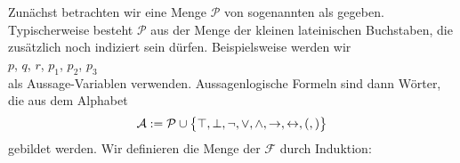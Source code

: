 Zunächst betrachten wir eine Menge $\mathcal{P}$  von
sogenannten   als gegeben. 
Typ\-ischerweise besteht $\mathcal{P}$ aus der Menge der kleinen lateinischen Buchstaben, die
zusätzlich noch indiziert sein dürfen.  Beispielsweise werden wir
\\[0.2cm]
\hspace*{1.3cm}
$p$, $q$, $r$, $p_1$, $p_2$, $p_3$
\\[0.2cm]
als Aussage-Variablen verwenden.
Aussagenlogische Formeln sind dann Wörter, die aus dem Alphabet
$$ 
  \mathcal{A} := \mathcal{P} \cup \bigl\{ \top, \bot, \neg, \vee, \wedge,
   \rightarrow, \leftrightarrow, (, ) \bigr\}
$$
gebildet werden.  Wir definieren die Menge der
$\mathcal{F}$ durch Induktion:
